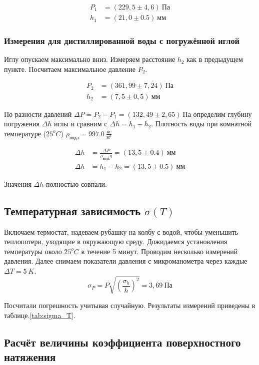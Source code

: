 \documentclass[a4paper,12pt]{article}
\begin{document}
			\begin{align*}
				P_1 &= (229,5 \pm 4,6) \ \text{Па}\\
				h_1 &= (21,0 \pm 0.5) \ \text{мм}
			\end{align*}

                \subsubsection{Измерения для дистиллированной воды с погружённой иглой}

			Иглу опускаем максимально вниз. Измеряем расстояние $h_2$ как в предыдущем пункте. Посчитаем максимальное давление $P_2$.

			\begin{align*}
				P_2 &= (361,99 \pm 7,24)\ \text{Па}\\
				h_2 &= (7,5 \pm 0,5)\ \text{мм}
			\end{align*}

			По разности давлений $\Delta P = P_2 - P_1 = (132,49 \pm 2,65)\ \text{Па}$ определим глубину погружения $\Delta h$ иглы и сравним с $\Delta h = h_1 - h_2$. Плотность воды при комнатной температуре ($25^oC$) $\rho_{\text{вода}} = 997.0\ \frac{\text{кг}}{\text{м}^3}$


			\begin{align*}
				\Delta h &= \frac{\Delta P}{\rho_{вода} g} = (13,5 \pm 0.4)~мм\\
				\Delta h &= h_1 - h_2 = (13,5 \pm 0.5)~мм
			\end{align*}

                Значения $\Delta h$ полностью совпали.

		\subsection{Температурная зависимость $\sigma(T)$}

			Включаем термостат, надеваем рубашку на колбу с водой, чтобы уменьшить теплопотери, уходящие в окружающую среду. Дожидаемся установления температуры около $25^oC$ в течение 5 минут. Проводим несколько измерений давления. Далее снимаем показатели давления с микроманометра через каждые $\Delta T = 5\ K$.
            \[
            \sigma_P = P \sqrt{\left( \frac{\sigma_h}{h} \right)^2} = 3,69 \ \text{Па}
            \]

			Посчитали погрешность учитывая случайную. Результаты измерений приведены в таблице.\ref{tab:sigma_T}.

		\subsection{Расчёт величины коэффициента поверхностного натяжения}
\end{document}
